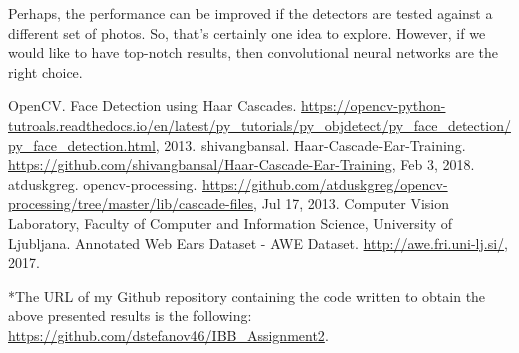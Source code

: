 \documentclass[9pt]{IEEEtran}
\begin{document}
Perhaps, the performance can be improved if the detectors are tested against a different set of photos. So, that's certainly one idea to explore. However, if we would like to have top-notch results, then convolutional neural networks are the right choice.


\begin{thebibliography}{99}
 OpenCV. Face Detection using Haar Cascades. \url{https://opencv-python-tutroals.readthedocs.io/en/latest/py_tutorials/py_objdetect/py_face_detection/py_face_detection.html}, 2013.
 shivangbansal. Haar-Cascade-Ear-Training. \url{https://github.com/shivangbansal/Haar-Cascade-Ear-Training}, Feb 3, 2018.
 atduskgreg. opencv-processing. \url{https://github.com/atduskgreg/opencv-processing/tree/master/lib/cascade-files}, Jul 17, 2013.
 Computer Vision Laboratory, Faculty of Computer and Information Science, University of Ljubljana. Annotated Web Ears Dataset - AWE Dataset. \url{http://awe.fri.uni-lj.si/}, 2017.
\end{thebibliography}

*The URL of my Github repository containing the code written to obtain the above presented results is the following: \url{https://github.com/dstefanov46/IBB_Assignment2}.
\end{document}
